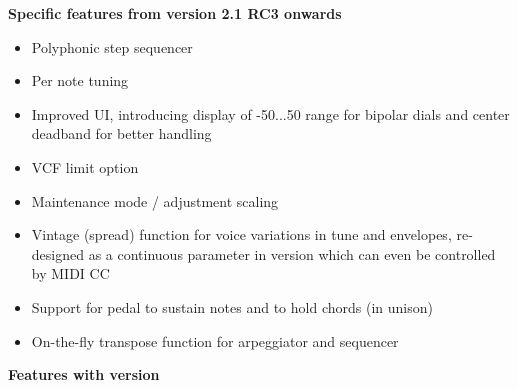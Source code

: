 \documentclass[landscape, 11pt, oneside]{report}
\newenvironment{flowtext}{\addmargin[0cm]{7cm}}{\endaddmargin} %
\begin{document}
\begin{flowtext}
\textbf{Specific features from version 2.1 RC3 onwards}
  
\begin{itemize}
  \setlength\itemsep{0cm}
  \item Polyphonic step sequencer
  \item Per note tuning
  \item Improved UI, introducing display of -50...50 range for bipolar dials and center deadband for better handling  
  \item VCF limit option
  \item Maintenance mode / adjustment scaling
  \item Vintage (spread) function for voice variations in tune and envelopes, re-designed as a continuous parameter in version \version which can even be controlled by MIDI CC   
  \item Support for pedal to sustain notes and to hold chords (in unison)
  \item On-the-fly transpose function for arpeggiator and sequencer
\end{itemize}

\textbf{Features with version \version}
  

\end{flowtext}
\end{document}
